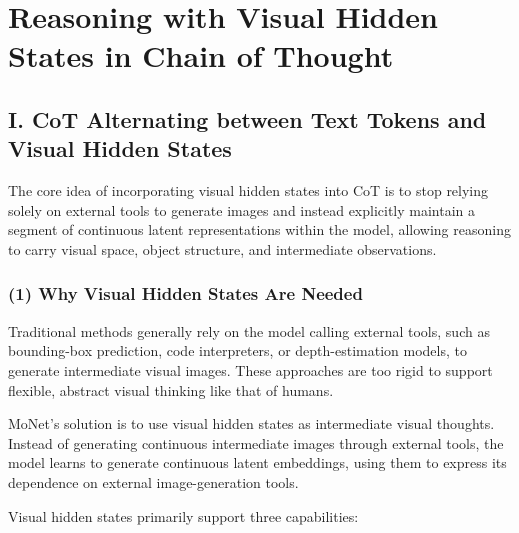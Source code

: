 \setcounter{section}{2}

\hypertarget{reasoning-with-visual-hidden-states-in-chain-of-thought}{%
\section{Reasoning with Visual Hidden States in Chain of Thought}\label{reasoning-with-visual-hidden-states-in-chain-of-thought}}

\hypertarget{i.-cot-alternating-between-text-tokens-and-visual-hidden-states}{%
\subsection{I. CoT Alternating between Text Tokens and Visual Hidden States}\label{i.-cot-alternating-between-text-tokens-and-visual-hidden-states}}

The core idea of incorporating visual hidden states into CoT is to stop relying solely on external tools to generate images and instead explicitly maintain a segment of continuous latent representations within the model, allowing reasoning to carry visual space, object structure, and intermediate observations.

\hypertarget{why-visual-hidden-states-are-needed}{%
\subsubsection{(1) Why Visual Hidden States Are Needed}\label{why-visual-hidden-states-are-needed}}

Traditional methods generally rely on the model calling external tools, such as bounding-box prediction, code interpreters, or depth-estimation models, to generate intermediate visual images. These approaches are too rigid to support flexible, abstract visual thinking like that of humans.

MoNet's solution is to use visual hidden states as intermediate visual thoughts. Instead of generating continuous intermediate images through external tools, the model learns to generate continuous latent embeddings, using them to express its dependence on external image-generation tools.

Visual hidden states primarily support three capabilities:


